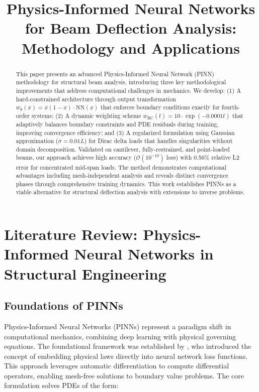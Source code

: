 \documentclass[12pt]{article}
\title{Physics-Informed Neural Networks for Beam Deflection Analysis: Methodology and Applications}
\author{}
\date{}
\begin{document}
\maketitle

\begin{abstract}
\noindent This paper presents an advanced Physics-Informed Neural Network (PINN) methodology for structural beam analysis, introducing three key methodological improvements that address computational challenges in mechanics. We develop: (1) A hard-constrained architecture through output transformation $w_{\theta}(x) = x(1-x)\cdot\text{NN}(x)$ that enforces boundary conditions exactly for fourth-order systems; (2) A dynamic weighting scheme $w_{\text{BC}}(t)=10\cdot\exp(-0.0001t)$ that adaptively balances boundary constraints and PDE residuals during training, improving convergence efficiency; and (3) A regularized formulation using Gaussian approximation ($\sigma = 0.01L$) for Dirac delta loads that handles singularities without domain decomposition. Validated on cantilever, fully-restrained, and point-loaded beams, our approach achieves high accuracy ($\mathcal{O}(10^{-10})$ loss) with 0.56\% relative L2 error for concentrated mid-span loads. The method demonstrates computational advantages including mesh-independent analysis and reveals distinct convergence phases through comprehensive training dynamics. This work establishes PINNs as a viable alternative for structural deflection analysis with extensions to inverse problems.
\end{abstract}

\section{Literature Review: Physics-Informed Neural Networks in Structural Engineering}
\subsection{Foundations of PINNs}
Physics-Informed Neural Networks (PINNs) represent a paradigm shift in computational mechanics, combining deep learning with physical governing equations. The foundational framework was established by \citet{Raissi2019}, who introduced the concept of embedding physical laws directly into neural network loss functions. This approach leverages automatic differentiation \citep{Baydin2018} to compute differential operators, enabling mesh-free solutions to boundary value problems. The core formulation solves PDEs of the form:
\end{document}
